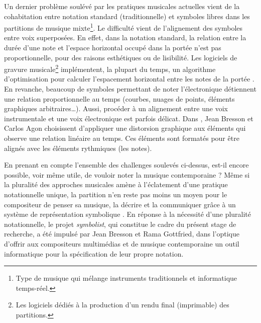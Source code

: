 Un dernier problème soulévé par les pratiques musicales actuelles vient de la cohabitation entre notation standard (traditionnelle) et symboles \og libres \fg dans les partitions de musique mixte\footnote{Type de musique qui mélange instruments traditionnels et informatique temps-réel.}. Le difficulté vient de l'alignement des symboles entre voix superposées. En effet, dans la notation standard, la relation entre la durée d'une note et l'espace horizontal occupé dans la portée n'est pas proportionnelle, pour des raisons esthétiques ou de lisibilité. Les logiciels de gravure musicale\footnote{Les logiciels dédiés à la production d'un rendu final (imprimable) des partitions.} implémentent, la plupart du temps, un algorithme d'optimisation pour calculer l'espacement horizontal entre les notes de la portée \cite{solomon2011}.
En revanche, beaucoup de symboles permettant de noter l'électronique détiennent une relation proportionnelle au temps (courbes, nuages de points, éléments graphiques arbitraires…).
Aussi, procéder à un alignement entre une voix instrumentale et une voix électronique est parfois délicat. Dans \cite{bresson2008}, Jean Bresson et Carlos Agon choisissent d'appliquer une distorsion graphique aux éléments qui observe une relation linéaire au temps. Ces éléments sont formatés pour être alignés avec les éléments rythmiques (les notes).

\bigskip
En prenant en compte l'ensemble des challenges soulevés ci-dessus, est-il encore possible, voir même utile, de vouloir noter la musique contemporaine ?
Même si la pluralité des approches musicales amène à l'éclatement d'une pratique notationnelle unique, la partition n'en reste pas moins \og un moyen pour le compositeur de penser sa musique, la décrire et la communiquer grâce à un système de représentation symbolique \fg \cite{bresson2008}.
En réponse à la nécessité d'une pluralité notationnelle, le projet \textit{symbolist}, qui constitue le cadre du présent stage de recherche, a été impulsé par Jean Bresson et Rama Gottfried, dans l'optique d'offrir aux compositeurs multimédias et de musique contemporaine un outil informatique pour la spécification de leur propre notation.
